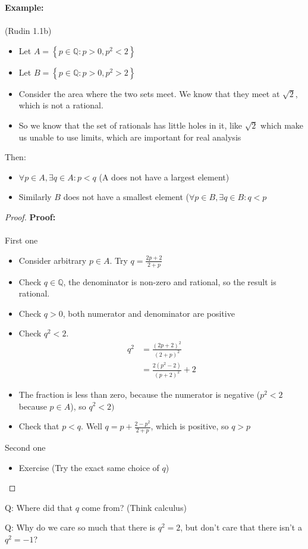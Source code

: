 \documentclass{article}
\newcommand{\Q}{\mathbb{Q}}
\begin{document}
	\begin{example} \textbf{Example:} \\
		\\
		(Rudin 1.1b) 
		\begin{itemize}
			\item Let $A = \left\{ p\in\Q: p>0, p^2<2\right\}$
			\item Let $B = \left\{ p\in\Q : p>0, p^2>2\right\}$
			\item Consider the area where the two sets meet. We know that they meet at $\sqrt{2}$, which is not a rational. 
			\item So we know that the set of rationals has little holes in it, like $\sqrt{2}$ which make us unable to use limits, which are important for real analysis 
		\end{itemize}
		Then:
		\begin{itemize}
			\item $\forall p\in A, \exists q\in A: p<q$ (A does not have a largest element)
			\item Similarly $B$ does not have a smallest element ($\forall p\in B, \exists q\in B: q<p$
		\end{itemize}
		\begin{proof} 
		\textbf{Proof:} \\
		~\\
		First one
		\begin{itemize}
			\item Consider arbitrary $p\in A$. Try $q = \frac{2p+2}{2+p}$ 
			\item Check $q\in\Q$, the denominator is non-zero and rational, so the result is rational.
			\item Check $q>0$, both numerator and denominator are positive
			\item Check $q^2<2$.
			\begin{align}
				q^2 &= \frac{(2p+2)^2}{(2+p)^2} \\
				    &= \frac{2(p^2-2)}{(p+2)^2} +2
			\end{align}
			\item The fraction is less than zero, because the numerator is negative ($p^2 <2$ because $p\in A$), so $q^2<2)$
			\item Check that $p<q$. Well $q = p + \frac{2-p^2}{2+p}$, which is positive, so $q>p$
		\end{itemize}
		Second one
		\begin{itemize}
			\item Exercise (Try the exact same choice of $q$)
		\end{itemize}
		\end{proof}
	\item Q: Where did that $q$ come from? (Think calculus)
	\item Q: Why do we care so much that there is $q^2=2$, but don't care that there isn't a $q^2 = -1$?
\end{example}
\end{document}
